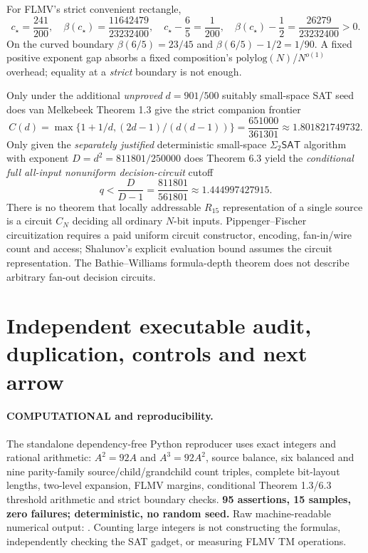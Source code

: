 \documentclass[11pt]{article}
\newcommand{\SAT}{\mathsf{SAT}}
\begin{document}
For FLMV's strict convenient rectangle,
\[
c_\star=\frac{241}{200},\quad
\beta(c_\star)=\frac{11642479}{23232400},\quad
c_\star-\frac65=\frac1{200},\quad
\beta(c_\star)-\frac12=\frac{26279}{23232400}>0.
\]
On the curved boundary $\beta(6/5)=23/45$ and
$\beta(6/5)-1/2=1/90$. A fixed positive exponent gap absorbs a
fixed composition's $\mathrm{polylog}(N)$/$N^{o(1)}$ overhead;
equality at a \emph{strict} boundary is not enough.

Only under the additional \emph{unproved} $d=901/500$ suitably small-space
SAT seed does van Melkebeek Theorem 1.3 give the strict companion frontier
\[
C(d)=\max\{1+1/d,(2d-1)/(d(d-1))\}
=\frac{651000}{361301}\approx1.801821749732.
\]
Only given the \emph{separately justified} deterministic small-space
$\Sigma_2\SAT$ algorithm with exponent $D=d^2=811801/250000$
does Theorem 6.3 yield the \emph{conditional full all-input
nonuniform decision-circuit} cutoff
\[
q<\frac{D}{D-1}=\frac{811801}{561801}
\approx1.444997427915.
\]
There is no theorem that locally addressable $R_{15}$ representation of a
single source is a circuit $C_N$ deciding all ordinary $N$-bit inputs.
Pippenger--Fischer circuitization requires a paid uniform circuit
constructor, encoding, fan-in/wire count and access; Shalunov's
explicit evaluation bound assumes the circuit representation.
The Bathie--Williams formula-depth theorem does not describe arbitrary
fan-out decision circuits.

\section{Independent executable audit, duplication, controls and next arrow}
\paragraph{COMPUTATIONAL and reproducibility.}
The standalone dependency-free Python reproducer
uses exact integers and rational arithmetic: $A^2=92A$ and
$A^3=92A^2$, source balance, six balanced and nine parity-family
source/child/grandchild count triples, complete bit-layout lengths,
two-level expansion, FLMV margins, conditional Theorem 1.3/6.3
threshold arithmetic and strict boundary checks. \textbf{95 assertions,
15 samples, zero failures; deterministic, no random seed.}
Raw machine-readable numerical output:
.
Counting large integers is not constructing the formulas, independently
checking the SAT gadget, or measuring FLMV TM operations.
\end{document}
